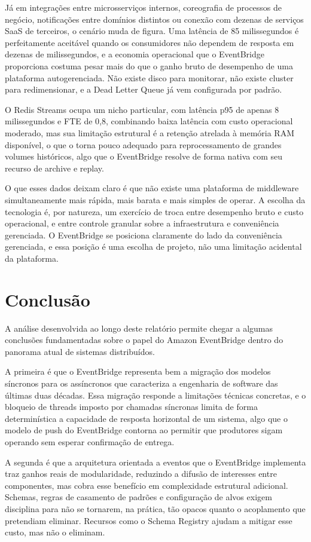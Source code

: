 \documentclass[12pt, a4paper]{article}
\begin{document}
Já em integrações entre microsserviços internos, coreografia de processos de negócio, notificações entre domínios distintos ou conexão com dezenas de serviços SaaS de terceiros, o cenário muda de figura. Uma latência de 85 milissegundos é perfeitamente aceitável quando os consumidores não dependem de resposta em dezenas de milissegundos, e a economia operacional que o EventBridge proporciona costuma pesar mais do que o ganho bruto de desempenho de uma plataforma autogerenciada. Não existe disco para monitorar, não existe cluster para redimensionar, e a Dead Letter Queue já vem configurada por padrão.

O Redis Streams ocupa um nicho particular, com latência p95 de apenas 8 milissegundos e FTE de 0,8, combinando baixa latência com custo operacional moderado, mas sua limitação estrutural é a retenção atrelada à memória RAM disponível, o que o torna pouco adequado para reprocessamento de grandes volumes históricos, algo que o EventBridge resolve de forma nativa com seu recurso de archive e replay.

O que esses dados deixam claro é que não existe uma plataforma de middleware simultaneamente mais rápida, mais barata e mais simples de operar. A escolha da tecnologia é, por natureza, um exercício de troca entre desempenho bruto e custo operacional, e entre controle granular sobre a infraestrutura e conveniência gerenciada. O EventBridge se posiciona claramente do lado da conveniência gerenciada, e essa posição é uma escolha de projeto, não uma limitação acidental da plataforma.


\section{Conclusão}

A análise desenvolvida ao longo deste relatório permite chegar a algumas conclusões fundamentadas sobre o papel do Amazon EventBridge dentro do panorama atual de sistemas distribuídos.

A primeira é que o EventBridge representa bem a migração dos modelos síncronos para os assíncronos que caracteriza a engenharia de software das últimas duas décadas. Essa migração responde a limitações técnicas concretas, e o bloqueio de threads imposto por chamadas síncronas limita de forma determinística a capacidade de resposta horizontal de um sistema, algo que o modelo de push do EventBridge contorna ao permitir que produtores sigam operando sem esperar confirmação de entrega.

A segunda é que a arquitetura orientada a eventos que o EventBridge implementa traz ganhos reais de modularidade, reduzindo a difusão de interesses entre componentes, mas cobra esse benefício em complexidade estrutural adicional. Schemas, regras de casamento de padrões e configuração de alvos exigem disciplina para não se tornarem, na prática, tão opacos quanto o acoplamento que pretendiam eliminar. Recursos como o Schema Registry ajudam a mitigar esse custo, mas não o eliminam.
\end{document}
